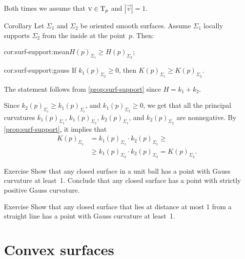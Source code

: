 Both times we assume  that  $\text{\sc{v}}\in\mathrm{T}_p$ and $|\vec v|=1$.\qeds

\begin{thm}{Corollary}\label{cor:surf-support}
Let $\Sigma_1$ and $\Sigma_2$ be oriented smooth surfaces.
Assume $\Sigma_1$ locally supports $\Sigma_2$ from the inside at the point~$p$.
Then:

\begin{subthm}{cor:surf-support:mean}$H(p)_{\Sigma_1}\ge H(p)_{\Sigma_2}$;
\end{subthm}

\begin{subthm}{cor:surf-support:gauss} If $k_1(p)_{\Sigma_2}\ge 0$, then $K(p)_{\Sigma_1}\ge K(p)_{\Sigma_2}$.
\end{subthm}
 
\end{thm}

The statement follows from  \ref{prop:surf-support} since $H=k_1+k_2$.


 Since $k_2(p)_{\Sigma_i}\ge k_1(p)_{\Sigma_i}$, and $k_1(p)_{\Sigma_2}\ge 0$, we get that all the principal curvatures 
$k_1(p)_{\Sigma_1}$, 
$k_1(p)_{\Sigma_2}$, 
$k_2(p)_{\Sigma_1}$, and 
$k_2(p)_{\Sigma_2}$ are nonnegative.
By \ref{prop:surf-support}, it implies that
\begin{align*}
K(p)_{\Sigma_1}&=k_1(p)_{\Sigma_1}\cdot k_2(p)_{\Sigma_1}\ge 
\\
&\ge k_1(p)_{\Sigma_2}\cdot k_2(p)_{\Sigma_2}=K(p)_{\Sigma_2}.
\end{align*}
\qedsf

\begin{thm}{Exercise}\label{ex:positive-gauss-0}
Show that any closed surface in a unit ball has a point with Gauss curvature at least~1.
Conclude that any closed surface has a point with strictly positive Gauss curvature.
\end{thm}

\begin{thm}{Exercise}\label{ex:positive-gauss}
Show that any closed surface that lies at distance at most 1 from a straight line has a point with Gauss curvature at least~1.
\end{thm}

\section{Convex surfaces}

